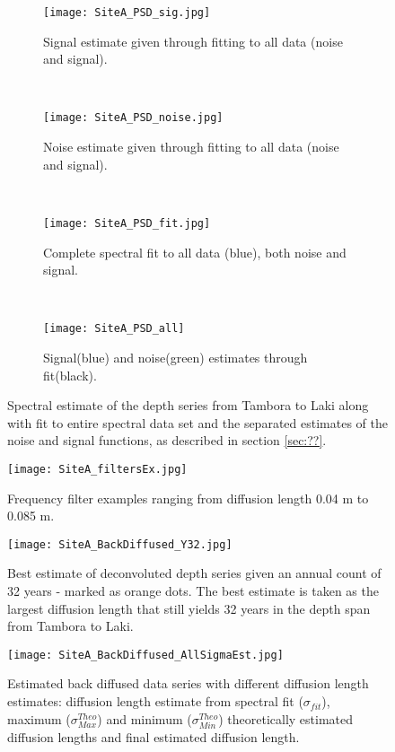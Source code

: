 \documentclass[../../CompleteThesis/Complete_1stDraft.tex]{subfiles}
\begin{document}
\begin{figure}
	\centering
	\begin{subfigure}{.35\textwidth}
		\centering
		\texttt{[image: SiteA\_PSD\_sig.jpg]}
		\caption{Signal estimate given through fitting to all data (noise and signal).}
		\label{fig:SiteA_PSD_sig}
	\end{subfigure}%
	~~~~
	\begin{subfigure}{.35\textwidth}
		\centering
		\texttt{[image: SiteA\_PSD\_noise.jpg]}
		\caption{Noise estimate given through fitting to all data (noise and signal).}
		\label{fig:SiteA_PSD_noise}
	\end{subfigure}%
	~~~~
	\begin{subfigure}{.35\textwidth}
		\centering
		\texttt{[image: SiteA\_PSD\_fit.jpg]}
		\caption{Complete spectral fit to all data (blue), both noise and signal.}
		\label{fig:SiteA_PSD_fit}
	\end{subfigure}\\[1ex]
	\begin{subfigure}{0.9\linewidth}
		\centering
		\texttt{[image: SiteA\_PSD\_all]}
		\caption{Signal(blue) and noise(green) estimates through fit(black).}
		\label{fig:SiteA_PSD_all}
	\end{subfigure}
	\caption[Spectral fit, Site A]{Spectral estimate of the depth series from Tambora to Laki along with fit to entire spectral data set and the separated estimates of the noise and signal functions, as described in section \ref{sec:??}.}
	\label{fig:test}
\end{figure}




\begin{figure}
	\centering
	\texttt{[image: SiteA\_filtersEx.jpg]}
	\caption[Frequency filters example, Site A]{Frequency filter examples ranging from diffusion length 0.04 m to 0.085 m.}
	\label{fig:SiteA_filtersEx}
\end{figure}

\begin{figure}
	\centering
	\texttt{[image: SiteA\_BackDiffused\_Y32.jpg]}
	\caption[Best estimate of deconvoluted depth series, Site A]{Best estimate of deconvoluted depth series given an annual count of 32 years - marked as orange dots. The best estimate is taken as the largest diffusion length that still yields 32 years in the depth span from Tambora to Laki.}
	\label{fig:SiteA_BackDiffused_Y32}
\end{figure}

\begin{figure}
	\centering
	\texttt{[image: SiteA\_BackDiffused\_AllSigmaEst.jpg]}
	\caption[All diffusion length estimate deconvolutions, Site A]{Estimated back diffused data series with different diffusion length estimates: diffusion length estimate from spectral fit ($\sigma_{fit}$), maximum ($\sigma_{Max}^{Theo}$) and minimum ($\sigma_{Min}^{Theo}$) theoretically estimated diffusion lengths and final estimated diffusion length.}
	\label{fig:SiteA_BackDiffused_AllSigmaEst}
\end{figure}
\end{document}
